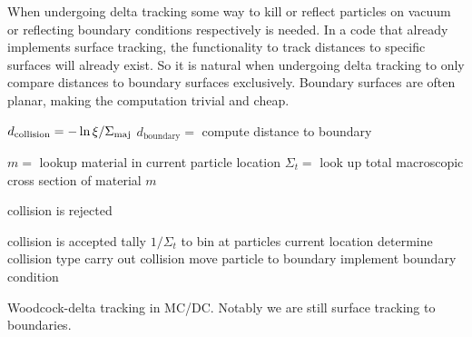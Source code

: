 When undergoing delta tracking some way to kill or reflect particles on vacuum or reflecting boundary conditions respectively is needed.
In a code that already implements surface tracking, the functionality to track distances to specific surfaces will already exist.
So it is natural when undergoing delta tracking to only compare distances to boundary surfaces exclusively.
Boundary surfaces are often planar, making the computation trivial and cheap.

\begin{algorithm}
\begin{algorithmic}[1]
        \State $d_{\text{collision}} = -\ln{\xi} / \Sigma_{\text{maj}} $
        \State $d_{\text{boundary}} =$ compute distance to boundary
        
            \State $m =$ lookup material in current particle location
            \State $\Sigma_{t} =$ look up total macroscopic cross section of material $m$ 

                \State collision is rejected

            \Else 
                \State collision is accepted
                \State tally $1/\Sigma_t$ to bin at particles current location
                \State determine collision type 
                \State carry out collision
            \EndIf
         \Else 
            \State move particle to boundary
            \State implement boundary condition
        \EndIf
    \EndWhile
    \caption{Woodcock-delta tracking in MC/DC. Notably we are still surface tracking to boundaries.}
    \label{alg:trad}
\end{algorithmic}
\end{algorithm}

